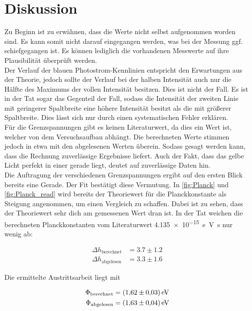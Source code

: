 %

%
\section{Diskussion}
\label{sec:Diskussion}

Zu Beginn ist zu erwähnen, dass die Werte nicht selbst aufgenommen worden sind. Es kann somit nicht darauf eingegangen werden, was 
bei der Messung ggf. schiefgegangen ist. Es können lediglich die vorhandenen Messwerte auf ihre Plausibilität überprüft werden. \\
\noindent Der Verlauf der blauen Photostrom-Kennlinien entspricht den Erwartungen aus der Theorie, jedoch sollte der Verlauf bei 
der halben Intensität auch nur die Hälfte des Maximums der vollen Intensität besitzen. Dies ist nicht der Fall. Es ist in der Tat 
sogar das Gegenteil der Fall, sodass die Intensität der zweiten Linie mit geringerer Spaltbreite eine höhere Intensität besitzt als 
die mit größerer Spaltbreite. Dies lässt sich nur durch einen systematischen Fehler erklären. \\

Für die Grenzspannungen gibt es keinen Literaturwert, da dies ein Wert ist, welcher von dem Versuchsaufbau abhängt. Die berechneten 
Werte stimmen jedoch in etwa mit den abgelesenen Werten überein. Sodass gesagt werden kann, dass die Rechnung zuverlässige 
Ergebnisse liefert. Auch der Fakt, dass das gelbe Licht perfekt in einer gerade liegt, deutet auf zuverlässige Daten hin.\\
\noindent Die Auftragung der verschiedenen Grenzspannungen ergibt auf den ersten Blick bereits eine Gerade. Der Fit bestätigt 
diese Vermutung. In \autoref{fig:Planck} und \autoref{fig:Planck_read} wird bereits der Theoriewert für die Planckkonstante als 
Steigung angenommen, um einen Vergleich zu schaffen. Dabei ist zu sehen, dass der Theoriewert sehr dich am gemessenen Wert dran ist. 
In der Tat weichen die berechneten Planckkonstanten vom Literaturwert \qty{4.135e-15}{e \volt \second} \cite{Planck} nur wenig ab: 

\begin{align*}
    \Delta{}h_\text{berechnet} &= 3.7\pm1.2 \\
    \Delta{}h_\text{abgelesen} &= 3.3\pm1.6
\end{align*}

\noindent Die ermittelte Austrittsarbeit liegt mit 

\begin{align*}
    \Phi_\text{berechnet} &= \qty{1.62\pm0.03}{e \volt}\\
    \Phi_\text{abgelesen} &= \qty{1.63\pm0.04}{e \volt}
\end{align*}

